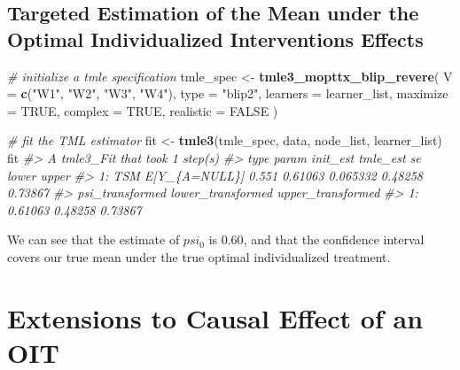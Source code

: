 \documentclass[12pt, krantz2,]{book}
\newenvironment{Shaded}{\begin{snugshade}}{\end{snugshade}}
\newcommand{\CommentTok}[1]{\textcolor[rgb]{0.56,0.35,0.01}{\textit{#1}}}
\newcommand{\DataTypeTok}[1]{\textcolor[rgb]{0.13,0.29,0.53}{#1}}
\newcommand{\KeywordTok}[1]{\textcolor[rgb]{0.13,0.29,0.53}{\textbf{#1}}}
\newcommand{\NormalTok}[1]{#1}
\newcommand{\OtherTok}[1]{\textcolor[rgb]{0.56,0.35,0.01}{#1}}
\newcommand{\StringTok}[1]{\textcolor[rgb]{0.31,0.60,0.02}{#1}}
\theoremstyle{definition}
\theoremstyle{definition}
\theoremstyle{definition}
\newcommand{\1}{\mathbbm{1}}
\begin{document}
\hypertarget{targeted-estimation-of-the-mean-under-the-optimal-individualized-interventions-effects-1}{%
\subsection{Targeted Estimation of the Mean under the Optimal Individualized Interventions Effects}\label{targeted-estimation-of-the-mean-under-the-optimal-individualized-interventions-effects-1}}

\begin{Shaded}
\begin{Highlighting}[]
\CommentTok{# initialize a tmle specification}
\NormalTok{tmle_spec <-}\StringTok{ }\KeywordTok{tmle3_mopttx_blip_revere}\NormalTok{(}
  \DataTypeTok{V =} \KeywordTok{c}\NormalTok{(}\StringTok{"W1"}\NormalTok{, }\StringTok{"W2"}\NormalTok{, }\StringTok{"W3"}\NormalTok{, }\StringTok{"W4"}\NormalTok{), }\DataTypeTok{type =} \StringTok{"blip2"}\NormalTok{,}
  \DataTypeTok{learners =}\NormalTok{ learner_list, }\DataTypeTok{maximize =} \OtherTok{TRUE}\NormalTok{, }\DataTypeTok{complex =} \OtherTok{TRUE}\NormalTok{,}
  \DataTypeTok{realistic =} \OtherTok{FALSE}
\NormalTok{)}
\end{Highlighting}
\end{Shaded}

\begin{Shaded}
\begin{Highlighting}[]
\CommentTok{# fit the TML estimator}
\NormalTok{fit <-}\StringTok{ }\KeywordTok{tmle3}\NormalTok{(tmle_spec, data, node_list, learner_list)}
\NormalTok{fit}
\CommentTok{#> A tmle3_Fit that took 1 step(s)}
\CommentTok{#>    type         param init_est tmle_est       se   lower   upper}
\CommentTok{#> 1:  TSM E[Y_\{A=NULL\}]    0.551  0.61063 0.065332 0.48258 0.73867}
\CommentTok{#>    psi_transformed lower_transformed upper_transformed}
\CommentTok{#> 1:         0.61063           0.48258           0.73867}
\end{Highlighting}
\end{Shaded}

We can see that the estimate of \(psi_0\) is \(0.60\), and that the confidence
interval covers our true mean under the true optimal individualized treatment.

\hypertarget{extensions-to-causal-effect-of-an-oit}{%
\section{Extensions to Causal Effect of an OIT}\label{extensions-to-causal-effect-of-an-oit}}
\end{document}

